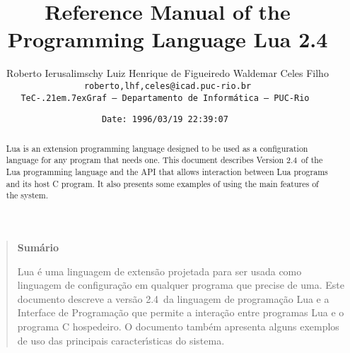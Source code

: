 

\newcommand{\rw}[1]{{\bf #1}}
\newcommand{\see}[1]{see Section~\ref{#1}}
\newcommand{\nil}{{\bf nil}}
\newcommand{\Line}{\rule{\linewidth}{.5mm}}
\def\tecgraf{{\sf TeC\kern-.21em\lower.7ex\hbox{Graf}}}

\newcommand{\Index}[1]{#1\index{#1}}
\newcommand{\IndexVerb}[1]{{\tt #1}\index{#1}}
\newcommand{\Def}[1]{{\em #1}\index{#1}}
\newcommand{\Deffunc}[1]{\index{#1}}

\newcommand{\Version}{2.4}

\makeindex



\title{Reference Manual of the Programming Language Lua \Version}

\author{%
Roberto Ierusalimschy\quad
Luiz Henrique de Figueiredo\quad
Waldemar Celes Filho
\vspace{1.0ex}\\
\smallskip
\small\tt roberto,lhf,celes@icad.puc-rio.br
\vspace{2.0ex}\\
\tecgraf\ --- Departamento de Inform\'atica --- PUC-Rio
}

\date{\small \verb$Date: 1996/03/19 22:39:07 $}

\maketitle

\begin{abstract}
\noindent
Lua is an extension programming language designed to be used
as a configuration language for any program that needs one.
This document describes Version \Version\ of the Lua programming language and
the API that allows interaction between Lua programs and its host C program.
It also presents some examples of using the main features of the system.
\end{abstract}

\vspace{4ex}
\begin{quotation}
\small
\begin{center}{\bf Sum\'ario}\end{center}
\vspace{1ex}
\noindent
Lua \'e uma linguagem de extens\~ao projetada para ser usada como
linguagem de configura\c{c}\~ao em qualquer programa que precise de
uma.
Este documento descreve a vers\~ao \Version\ da linguagem de
programa\c{c}\~ao Lua e a Interface de Programa\c{c}\~ao que permite
a intera\c{c}\~ao entre programas Lua e o programa C hospedeiro.
O documento tamb\'em apresenta alguns exemplos de uso das principais
ca\-racte\-r\'{\i}sticas do sistema.
\end{quotation}


